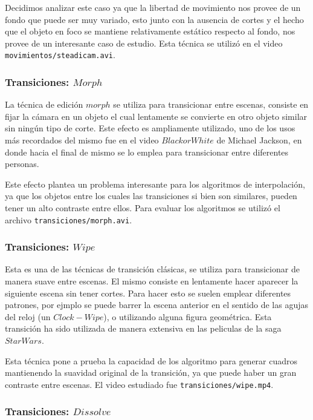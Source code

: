 Decidimos analizar este caso ya que la libertad de movimiento nos provee de un fondo que puede ser muy variado, esto junto con la ausencia de cortes y el hecho que el objeto en foco se mantiene relativamente estático respecto al fondo, nos provee de un interesante caso de estudio. Esta técnica se utilizó en el video \texttt{movimientos/steadicam.avi}.

\subsubsection{Transiciones: $Morph$}

La técnica de edición $morph$ se utiliza para transicionar entre escenas, consiste en fijar la cámara en un objeto el cual lentamente se convierte en otro objeto similar sin ningún tipo de corte. Este efecto es ampliamente utilizado, uno de los usos más recordados del mismo fue en el video $Black or White$ de Michael Jackson, en donde hacia el final de mismo se lo emplea para transicionar entre diferentes personas.

Este efecto plantea un problema interesante para los algoritmos de interpolación, ya que los objetos entre los cuales las transiciones si bien son similares, pueden tener un alto contraste entre ellos. Para evaluar los algoritmos se utilizó el archivo \texttt{transiciones/morph.avi}.

\subsubsection{Transiciones: $Wipe$}

Esta es una de las técnicas de transición clásicas, se utiliza para transicionar de manera suave entre escenas. El mismo consiste en lentamente hacer aparecer la siguiente escena sin tener cortes. Para hacer esto se suelen emplear diferentes patrones, por ejmplo se puede barrer la escena anterior en el sentido de las agujas del reloj (un $Clock-Wipe$), o utilizando alguna figura geométrica. Esta transición ha sido utilizada de manera extensiva en las peliculas de la saga $Star Wars$.

Esta técnica pone a prueba la capacidad de los algoritmo para generar cuadros mantienendo la suavidad original de la transición, ya que puede haber un gran contraste entre escenas. El video estudiado fue \texttt{transiciones/wipe.mp4}.

\subsubsection{Transiciones: $Dissolve$}


